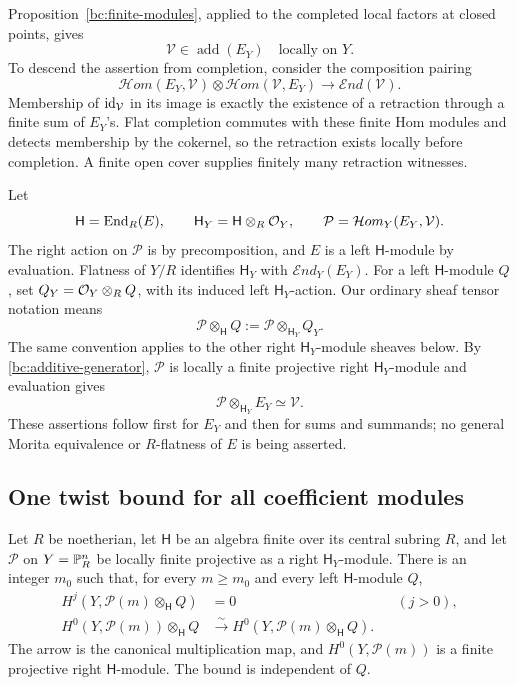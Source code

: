 Proposition~\ref{bc:finite-modules}, applied to the completed local
factors at closed points, gives
\begin{equation}\label{bc:additive-generator}
              \mathcal V\in\operatorname{add}(E_Y)
              \quad\text{locally on $Y$}.
\end{equation}
To descend the assertion from completion, consider the composition
pairing
\[
 \mathcal Hom(E_Y,\mathcal V)\otimes
 \mathcal Hom(\mathcal V,E_Y)\longrightarrow
 \mathcal End(\mathcal V).
\]
Membership of $\operatorname{id}_{\mathcal V}$ in its image is exactly the existence
of a retraction through a finite sum of $E_Y$'s.  Flat completion
commutes with these finite Hom modules and detects membership by the
cokernel, so the retraction exists locally before completion.  A finite
open cover supplies finitely many retraction witnesses.

Let
\[
 \mathsf H=\operatorname{End}_R(E),\qquad
 \mathsf H_Y=\mathsf H\otimes_R\mathcal O_Y,\qquad
 \mathcal P=\mathcal Hom_Y(E_Y,\mathcal V).
\]
The right action on $\mathcal P$ is by precomposition, and $E$ is a left
$\mathsf H$-module by evaluation.  Flatness of $Y/R$ identifies
$\mathsf H_Y$ with $\mathcal End_Y(E_Y)$.  For a left $\mathsf H$-module
$Q$, set $Q_Y=\mathcal O_Y\otimes_RQ$, with its induced left
$\mathsf H_Y$-action.  Our ordinary sheaf tensor notation means
\[
 \mathcal P\otimes_{\mathsf H}Q
       :=\mathcal P\otimes_{\mathsf H_Y}Q_Y.
\]
The same convention applies to the other right $\mathsf H_Y$-module
sheaves below.  By
\eqref{bc:additive-generator}, $\mathcal P$ is locally a finite
projective right $\mathsf H_Y$-module and evaluation gives
\begin{equation}\label{bc:evaluation}
               \mathcal P\otimes_{\mathsf H_Y}E_Y\simeq\mathcal V.
\end{equation}
These assertions follow first for $E_Y$ and then for sums and summands;
no general Morita equivalence or $R$-flatness of $E$ is being asserted.

\subsection{One twist bound for all coefficient modules}

\begin{lemma}\label{bc:uniform-twists}
Let $R$ be noetherian, let $\mathsf H$ be an algebra finite over its
central subring $R$, and let $\mathcal P$ on $Y=\mathbb P^n_R$ be locally
finite projective as a right $\mathsf H_Y$-module.  There is an integer
$m_0$ such that, for every $m\ge m_0$ and every left $\mathsf H$-module
$Q$,
\begin{align}
 H^j(Y,\mathcal P(m)\otimes_{\mathsf H}Q)&=0
                     &&(j>0),\label{bc:uniform-vanishing}\\
 H^0(Y,\mathcal P(m))\otimes_{\mathsf H}Q
       &\xrightarrow{\ \sim\ }
 H^0(Y,\mathcal P(m)\otimes_{\mathsf H}Q).
                     \label{bc:uniform-sections}
\end{align}
The arrow is the canonical multiplication map, and
$H^0(Y,\mathcal P(m))$ is a finite projective right $\mathsf H$-module.
The bound is independent of $Q$.
\end{lemma}

